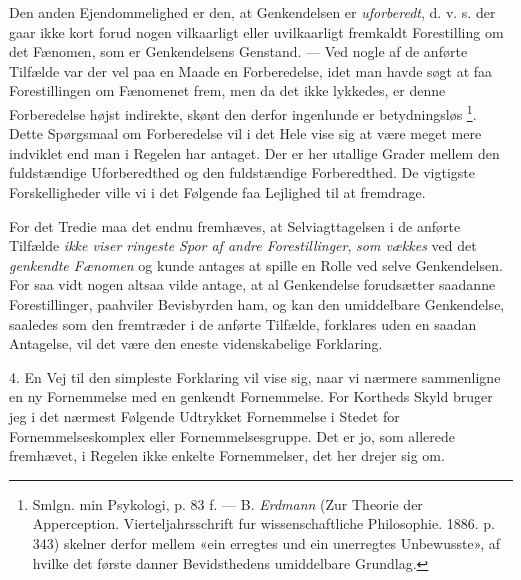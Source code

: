 \documentclass[12pt,a4paper,openany]{book}
\begin{document}
Den anden Ejendommelighed er den, at Genkendelsen er \emph{uforberedt}, d. v.
s. der gaar ikke kort forud nogen vilkaarligt eller uvilkaarligt fremkaldt
Forestilling om det Fænomen, som er Genkendelsens Genstand. --- Ved nogle af de
anførte Tilfælde var der vel paa en Maade en Forberedelse, idet man havde søgt
at faa Forestillingen om Fænomenet frem, men da det ikke lykkedes, er denne
Forberedelse højst indirekte, skønt den derfor ingenlunde er betydningsløs%
\footnote[2]{Smlgn. min Psykologi, p. 83 f. --- B. \emph{Erdmann} (Zur Theorie
der Apperception. Vierteljahrsschrift fur wissenschaftliche Philosophie. 1886.
p. 343) skelner derfor mellem «ein erregtes und ein unerregtes Unbewusste», af
hvilke det første danner Bevidsthedens umiddelbare Grundlag.}. Dette Spørgsmaal
om Forberedelse vil i det Hele vise sig at være meget mere indviklet end man i
Regelen har antaget. Der er her utallige Grader mellem den fuldstændige
Uforberedthed og den fuldstændige Forberedthed. De vigtigste Forskelligheder
ville vi i det Følgende faa Lejlighed til at fremdrage.

For det Tredie maa det endnu fremhæves, at Selviagttagelsen i de anførte
Tilfælde \emph{ikke viser ringeste Spor af andre Forestillinger}, \emph{som
vækkes} ved det \emph{genkendte Fænomen} og kunde antages at spille en Rolle
ved selve Genkendelsen. For saa vidt nogen altsaa vilde antage, at al
Genkendelse forudsætter saadanne Forestillinger, paahviler Bevisbyrden ham, og
kan den umiddelbare Genkendelse, saaledes som den fremtræder i de anførte
Tilfælde, forklares uden en saadan Antagelse, vil det være den eneste
videnskabelige Forklaring.

4. En Vej til den simpleste Forklaring vil vise sig, naar vi nærmere
sammenligne en ny Fornemmelse med en genkendt Fornemmelse. For Kortheds Skyld
bruger jeg i det nærmest Følgende Udtrykket Fornemmelse i Stedet for
Fornemmelseskomplex eller Fornemmelsesgruppe. Det er jo, som allerede
fremhævet, i Regelen ikke enkelte Fornemmelser, det her drejer sig om.
\end{document}
